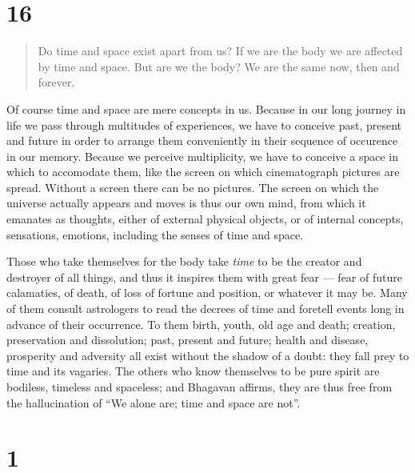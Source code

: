\documentclass[12pt]{report}
\begin{document}

\section*{16}

\begin{quote}
Do time and space exist apart from us? If we are the body we are
affected by time and space. But are we the body? We are the same now,
then and forever.
\end{quote}


Of course time and space are mere concepts in us. Because in our long
journey in life we pass through multitudes of experiences, we have to
conceive past, present and future in order to arrange them
conveniently in their sequence of occurence in our memory. Because we
perceive multiplicity, we have to conceive a space in which to
accomodate them, like the screen on which cinematograph pictures are
spread. Without a screen there can be no pictures. The screen on which
the universe actually appears and moves is thus our own mind, from
which it emanates as thoughts, either of external physical objects, or
of internal concepts, sensations, emotions, including the senses of
time and space. 

Those who take themselves for the body take \emph{time} to be the
creator and destroyer of all things, and thus it inspires them with
great fear --- fear of future calamaties, of death, of loss of fortune
and position, or whatever it may be. Many of them consult astrologers
to read the decrees of time and foretell events long in advance of
their occurrence. To them birth, youth, old age and death; creation,
preservation and dissolution; past, present and future; health and
disease, prosperity and adversity all exist without the shadow of a
doubt: they fall prey to time and its vagaries. The others who know
themselves to be pure spirit are bodiless, timeless and spaceless; and
Bhagavan affirms, they are thus free from the hallucination of ``We
alone are; time and space are not''.

\section*{1}

\begin{quote}

\end{quote}
\end{document}
